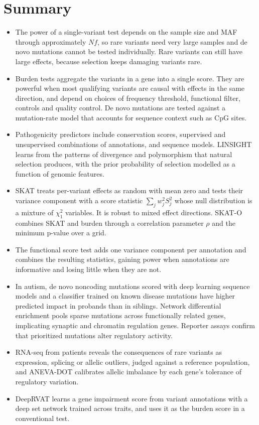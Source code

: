 \section{Summary}

\begin{itemize}
  \item The power of a single-variant test depends on the sample size and MAF through approximately $Nf$, so rare variants need very large samples and de novo mutations cannot be tested individually. Rare variants can still have large effects, because selection keeps damaging variants rare.
  \item Burden tests aggregate the variants in a gene into a single score. They are powerful when most qualifying variants are causal with effects in the same direction, and depend on choices of frequency threshold, functional filter, controls and quality control. De novo mutations are tested against a mutation-rate model that accounts for sequence context such as CpG sites.
  \item Pathogenicity predictors include conservation scores, supervised and unsupervised combinations of annotations, and sequence models. LINSIGHT learns from the patterns of divergence and polymorphism that natural selection produces, with the prior probability of selection modelled as a function of genomic features.
  \item SKAT treats per-variant effects as random with mean zero and tests their variance component with a score statistic $\sum_jw_j^2S_j^2$ whose null distribution is a mixture of $\chi^2_1$ variables. It is robust to mixed effect directions. SKAT-O combines SKAT and burden through a correlation parameter $\rho$ and the minimum p-value over a grid.
  \item The functional score test adds one variance component per annotation and combines the resulting statistics, gaining power when annotations are informative and losing little when they are not.
  \item In autism, de novo noncoding mutations scored with deep learning sequence models and a classifier trained on known disease mutations have higher predicted impact in probands than in siblings. Network differential enrichment pools sparse mutations across functionally related genes, implicating synaptic and chromatin regulation genes. Reporter assays confirm that prioritized mutations alter regulatory activity.
  \item RNA-seq from patients reveals the consequences of rare variants as expression, splicing or allelic outliers, judged against a reference population, and ANEVA-DOT calibrates allelic imbalance by each gene's tolerance of regulatory variation.
  \item DeepRVAT learns a gene impairment score from variant annotations with a deep set network trained across traits, and uses it as the burden score in a conventional test.
\end{itemize}

